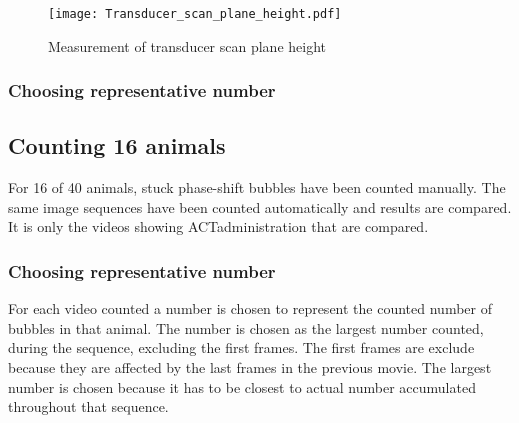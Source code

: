 \begin{figure}[h]
  \centering
  \texttt{[image: Transducer\_scan\_plane\_height.pdf]}
  \caption{Measurement of transducer scan plane height}
\end{figure}

\subsubsection{Choosing representative number}


\subsection{Counting 16 animals}
For 16 of 40 animals, stuck phase-shift bubbles have been counted manually\cite{Healey2014}. The same image sequences have been counted automatically and results are compared. It is only the videos showing ACT\textregistered administration that are compared.

\subsubsection{Choosing representative number} 
For each video counted a number is chosen to represent the counted number of bubbles in that animal. The number is chosen as the largest number counted, during the sequence, excluding the first frames. The first frames are exclude because they are affected by the last frames in the previous movie. The largest number is chosen because it has to be closest to actual number accumulated throughout that sequence.


